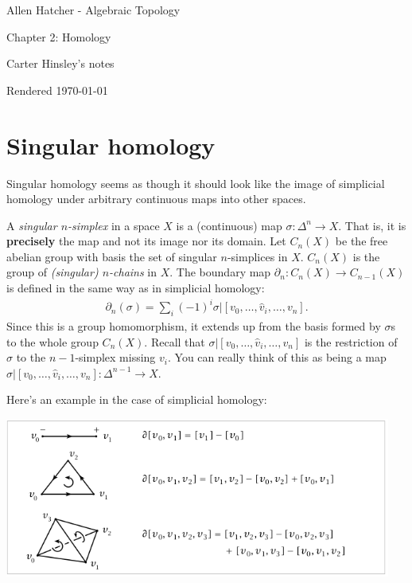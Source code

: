 \documentclass[a4paper]{article}
\begin{document}
\begin{center}
\LARGE{Allen Hatcher - Algebraic Topology}

\Large{Chapter 2: Homology}

\large{Carter Hinsley's notes}

Rendered \today
\end{center}

\section{Singular homology}

Singular homology seems as though it should look like the image of simplicial homology under arbitrary continuous maps into other spaces.

A \emph{singular $n$-simplex} in a space $X$ is a (continuous) map $\sigma : \Delta^n \to X$. That is, it is \textbf{precisely} the map and not its image nor its domain. Let $C_n(X)$ be the free abelian group with basis the set of singular $n$-simplices in $X$. $C_n(X)$ is the group of \emph{(singular) $n$-chains} in $X$. The boundary map $\partial_n : C_n(X) \to C_{n-1}(X)$ is defined in the same way as in simplicial homology:
\begin{align}
    \partial_n(\sigma) = \sum_i (-1)^i \sigma | [v_0, \ldots, \hat{v}_i, \ldots, v_n].
\end{align}
Since this is a group homomorphism, it extends up from the basis formed by $\sigma$s to the whole group $C_n(X)$. Recall that $\sigma|[v_0, \ldots, \hat{v}_i, \ldots, v_n]$ is the restriction of $\sigma$ to the $n-1$-simplex missing $v_i$. You can really think of this as being a map $\sigma|[v_0, \ldots, \hat{v}_i, \ldots, v_n] : \Delta^{n-1} \to X$.

Here's an example in the case of simplicial homology:
\begin{center}
\includegraphics[width=5in]{Hatcher - Algebraic Topology/graphics/simplicial_boundaries.png}
\end{center}
\end{document}
